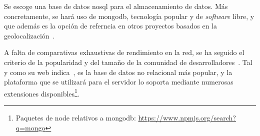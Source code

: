 \documentclass[main]{subfiles}
\begin{document}
Se escoge una base de datos \gls{nosql} para el almacenamiento de datos. Más concretamente, se hará uso de \gls{mongodb}, tecnología popular y de \emph{software} libre, y que además es la opción de referncia en otros proyectos basados en la geolocalización~\autocite{ibaivalencia}.

A falta de comparativas exhaustivas de rendimiento en la red, se ha seguido el criterio de la popularidad y del tamaño de la comunidad de desarrolladores~\autocite{whymongodb}. Tal y como su web indica~\autocite{mongodb}, es la base de datos no relacional más popular, y la plataforma que se utilizará para el servidor lo soporta mediante numerosas extensiones disponibles\footnote{Paquetes de \gls{node} relativos a \gls{mongodb}: \url{https://www.npmjs.org/search?q=mongo}}.
\end{document}
